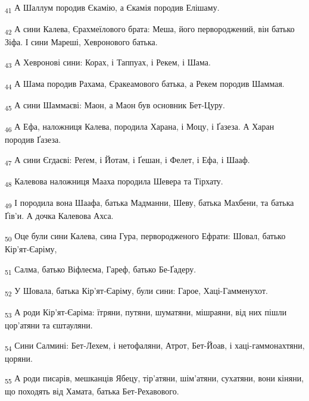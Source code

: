 \begin{tcolorbox}
\textsubscript{41} А Шаллум породив Єкамію, а Єкамія породив Елішаму.
\end{tcolorbox}
\begin{tcolorbox}
\textsubscript{42} А сини Калева, Єрахмеїлового брата: Меша, його первороджений, він батько Зіфа. І сини Мареші, Хевронового батька.
\end{tcolorbox}
\begin{tcolorbox}
\textsubscript{43} А Хевронові сини: Корах, і Таппуах, і Рекем, і Шама.
\end{tcolorbox}
\begin{tcolorbox}
\textsubscript{44} А Шама породив Рахама, Єракеамового батька, а Рекем породив Шаммая.
\end{tcolorbox}
\begin{tcolorbox}
\textsubscript{45} А сини Шаммаєві: Маон, а Маон був основник Бет-Цуру.
\end{tcolorbox}
\begin{tcolorbox}
\textsubscript{46} А Ефа, наложниця Калева, породила Харана, і Моцу, і Ґазеза. А Харан породив Ґазеза.
\end{tcolorbox}
\begin{tcolorbox}
\textsubscript{47} А сини Єгдаєві: Реґем, і Йотам, і Ґешан, і Фелет, і Ефа, і Шааф.
\end{tcolorbox}
\begin{tcolorbox}
\textsubscript{48} Калевова наложниця Мааха породила Шевера та Тірхату.
\end{tcolorbox}
\begin{tcolorbox}
\textsubscript{49} І породила вона Шаафа, батька Мадманни, Шеву, батька Махбени, та батька Ґів'и. А дочка Калевова Ахса.
\end{tcolorbox}
\begin{tcolorbox}
\textsubscript{50} Оце були сини Калева, сина Гура, первородженого Ефрати: Шовал, батько Кір'ят-Єаріму,
\end{tcolorbox}
\begin{tcolorbox}
\textsubscript{51} Салма, батько Віфлеєма, Гареф, батько Бе-Ґадеру.
\end{tcolorbox}
\begin{tcolorbox}
\textsubscript{52} У Шовала, батька Кір'ят-Єаріму, були сини: Гарое, Хаці-Гамменухот.
\end{tcolorbox}
\begin{tcolorbox}
\textsubscript{53} А роди Кір'ят-Єаріма: їтряни, путяни, шуматяни, мішраяни, від них пішли цор'атяни та єштауляни.
\end{tcolorbox}
\begin{tcolorbox}
\textsubscript{54} Сини Салмині: Бет-Лехем, і нетофаляни, Атрот, Бет-Йоав, і хаці-гаммонахтяни, цоряни.
\end{tcolorbox}
\begin{tcolorbox}
\textsubscript{55} А роди писарів, мешканців Ябецу, тір'атяни, шім'атяни, сухатяни, вони кіняни, що походять від Хамата, батька Бет-Рехавового.
\end{tcolorbox}
